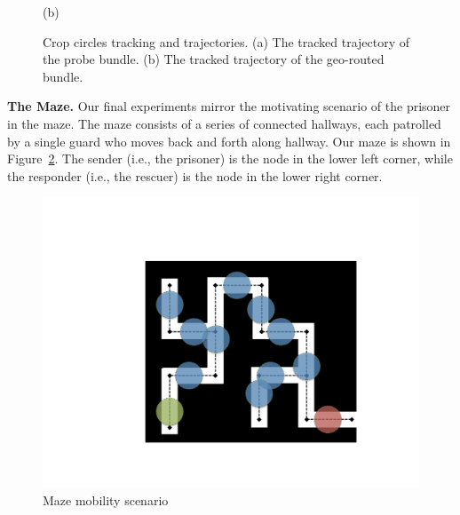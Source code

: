 \begin{figure}
\begin{center}
\vspace{-.25cm}
(b)
\end{center}
\vspace{-.5cm}
\caption{Crop circles tracking and trajectories. (a) The tracked
  trajectory of the probe bundle. (b) The tracked trajectory of the
  geo-routed bundle.}
\label{fig:cropCirclesExperiment}
\vspace{-.5cm}
\end{figure}


{\bf The Maze.} Our final experiments mirror the motivating scenario
of the prisoner in the maze. The maze consists of a series of
connected hallways, each patrolled by a single guard who moves back
and forth along hallway. Our maze is shown in
Figure~\ref{fig:maze}. The sender (i.e., the prisoner) is the node in
the lower left corner, while the responder (i.e., the rescuer) is the
node in the lower right corner.
\begin{figure}
\begin{center}
\includegraphics[width=.75\columnwidth]{figures/newMaze.pdf}
\end{center}
\vspace{-.75cm}
\caption{Maze mobility scenario}
\label{fig:maze}
\vspace{-.25cm}
\end{figure}

